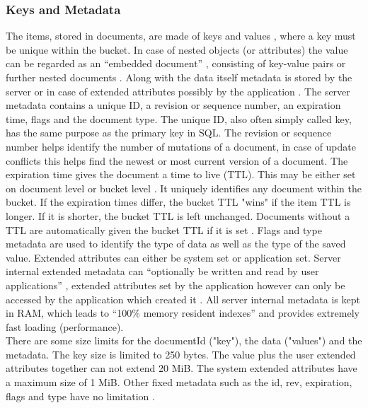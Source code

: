 \subsubsection{Keys and Metadata}
The items, stored in documents, are made of keys and values \parencite{couchbaseDocuData}, where a key must be unique within the bucket. In case of nested objects (or attributes) the value can be regarded as an “embedded document” \parencite{couchbaseDocuData}, consisting of key-value pairs or further nested documents \parencite{couchbaseDocuData}. 
Along with the data itself metadata is stored by the server \parencite{couchbaseDocuData} \parencite{objelean} or in case of extended attributes possibly by the application \parencite{couchbaseDocuData}. The server metadata contains a unique ID, a revision or sequence number, an expiration time, flags and the document type\parencite{couchbaseDocuData}. The unique ID, also often simply called key, has the same purpose as the primary key in SQL. The revision or sequence number helps identify the number of mutations of a document, in case of update conflicts this helps find the newest or most current version of a document. The expiration time gives the document a time to live (TTL). This may be either set on document level or bucket level \parencite{couchbaseDocuMemory}. It uniquely identifies any document within the bucket. If the expiration times differ, the bucket TTL "wins" if the item TTL is longer. If it is shorter, the bucket TTL is left unchanged. Documents without a TTL are automatically given the bucket TTL if it is set \parencite{couchbaseDocuExpiration}. Flags and type metadata are used to identify the type of data as well as the type of the saved value. Extended attributes can either be system set or application set. Server internal extended metadata can “optionally be written and read by user applications” \parencite{couchbaseDocuData}, extended attributes set by the application however can only be accessed by the application which created it \parencite{couchbaseDocuExtendedAttributes}. All server internal metadata is kept in RAM, which leads to “100\% memory resident indexes” \parencite{couchbaseWeb} and provides extremely fast loading (performance).\\
There are some size limits for the documentId ("key"), the data ("values") and the metadata. The key size is limited to 250 bytes. The value plus the user extended attributes together can not extend 20 MiB. The system extended attributes have a maximum size of 1 MiB. Other fixed metadata such as the id, rev, expiration, flags and type have no limitation \parencite{couchbaseDocuData}.
